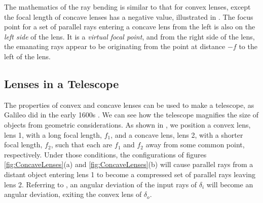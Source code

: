 The mathematics of the ray bending is similar to that for convex lenses, except the focal length of concave lenses has a negative value, illustrated in \fig{\ref{fig:ConcaveLenses}}.  The focus point for a set of parallel rays entering a concave lens from the left is also on the {\em left side} of the lens.  It is a {\em virtual focal point}, and from the right side of the lens, the emanating rays appear to be originating from the point at distance $-f$ to the left of the lens.  

\subsection{Lenses in a Telescope}

The properties of convex and concave lenses can be used to make a telescope,  as Galileo did in the early 1600s \cite{Galileo1610}. We can see how the telescope magnifies the size of objects from geometric considerations. As shown in , we position a convex lens, lens 1, with a long focal length, $f_1$, and a concave lens, lens 2, with a shorter focal length, $f_2$, such that each are $f_1$ and $f_2$ away from some common point, respectively.  Under those conditions, the configurations of figures \ref{fig:ConcaveLenses}(a) and \ref{fig:ConcaveLenses}(b) will cause parallel rays from a distant object entering lens 1 to become a compressed set of parallel rays leaving lens 2.  Referring to , an angular deviation of the input rays of $\delta_i$ will become an angular deviation, exiting the convex lens of $\delta_o$.  


